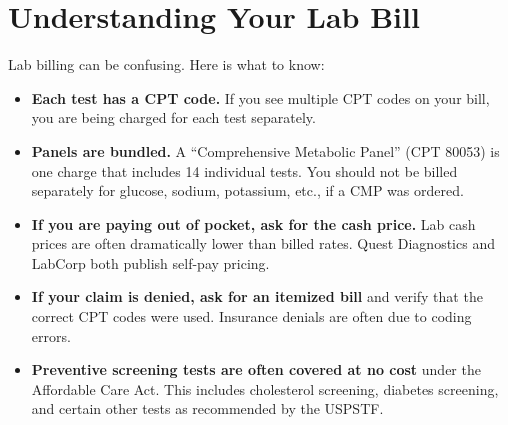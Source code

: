 \clearpage
\section{Understanding Your Lab Bill}

Lab billing can be confusing. Here is what to know:

\begin{itemize}
    \item \textbf{Each test has a CPT code.} If you see multiple CPT codes on your bill, you are being charged for each test separately.
    \item \textbf{Panels are bundled.} A ``Comprehensive Metabolic Panel'' (CPT 80053) is one charge that includes 14 individual tests. You should not be billed separately for glucose, sodium, potassium, etc., if a CMP was ordered.
    \item \textbf{If you are paying out of pocket, ask for the cash price.} Lab cash prices are often dramatically lower than billed rates. Quest Diagnostics and LabCorp both publish self-pay pricing.
    \item \textbf{If your claim is denied, ask for an itemized bill} and verify that the correct CPT codes were used. Insurance denials are often due to coding errors.
    \item \textbf{Preventive screening tests are often covered at no cost} under the Affordable Care Act. This includes cholesterol screening, diabetes screening, and certain other tests as recommended by the USPSTF.
\end{itemize}
